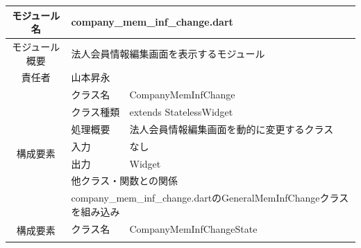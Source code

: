 \begin{table}[H]
  \centering
  \begin{tabular}{|c|l|l|} \hline
    モジュール名                & \multicolumn{2}{l|}{company\_mem\_inf\_change.dart}                                                                                      \\ \hline
    モジュール概要               & \multicolumn{2}{p{12cm}|}{法人会員情報編集画面を表示するモジュール}                                                                                          \\ \hline
    責任者                   & \multicolumn{2}{l|}{山本昇永}                                                                                                                \\ \hline
    \multirow{7}{*}{構成要素} & クラス名                                                                                  & CompanyMemInfChange                              \\ \cline{2-3}
                          & クラス種類                                                                                 & extends StatelessWidget                          \\ \cline{2-3}
                          & 処理概要                                                                                  & \multicolumn{1}{p{12cm}|}{法人会員情報編集画面を動的に変更するクラス} \\ \cline{2-3}
                          & 入力                                                                                    & なし                                               \\ \cline{2-3}
                          & 出力                                                                                    & Widget                                           \\ \cline{2-3}
                          & \multicolumn{2}{l|}{他クラス・関数との関係}                                                                                                         \\ \cline{2-3}
                          & \multicolumn{2}{p{14cm}|}{company\_mem\_inf\_change.dartのGeneralMemInfChangeクラスを組み込み}                                                    \\ \hline
    \multirow{7}{*}{構成要素} & クラス名                                                                                  & CompanyMemInfChangeState                         \\ \cline{2-3}

\end{tabular}
\end{table}
